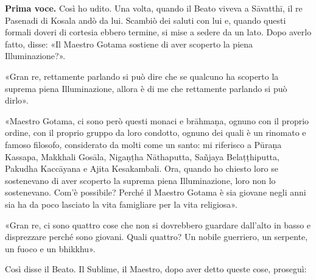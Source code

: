 \textbf{Prima voce.} Così ho udito. Una volta, quando il Beato viveva a Sāvatthī,
il re Pasenadi di Kosala andò da lui. Scambiò dei saluti con lui e,
quando questi formali doveri di cortesia ebbero termine, si mise a
sedere da un lato. Dopo averlo fatto, disse: «Il Maestro Gotama sostiene
di aver scoperto la piena Illuminazione?».


«Gran re, rettamente parlando si può dire che se qualcuno ha scoperto la
suprema piena Illuminazione, allora è di me che rettamente parlando si
può dirlo».


«Maestro Gotama, ci sono però questi monaci e brāhmaṇa, ognuno con il
proprio ordine, con il proprio gruppo da loro condotto, ognuno dei quali
è un rinomato e famoso filosofo, considerato da molti come un santo: mi
riferisco a Pūraṇa Kassapa, Makkhali Gosāla, Nigaṇṭha Nāthaputta,
Sañjaya Belaṭṭhiputta, Pakudha Kaccāyana e Ajita Kesakambali. Ora,
quando ho chiesto loro se sostenevano di aver scoperto la suprema piena
Illuminazione, loro non lo sostenevano. Com’è possibile? Perché il
Maestro Gotama è sia giovane negli anni sia ha da poco lasciato la vita
famigliare per la vita religiosa».


«Gran re, ci sono quattro cose che non si dovrebbero guardare dall’alto
in basso e disprezzare perché sono giovani. Quali quattro? Un nobile
guerriero, un serpente, un fuoco e un bhikkhu».


Così disse il Beato. Il Sublime, il Maestro, dopo aver detto queste
cose, proseguì:


